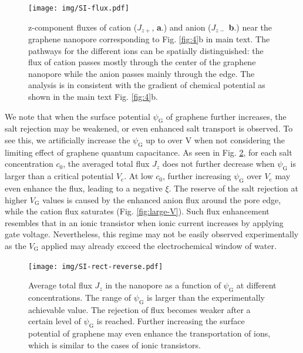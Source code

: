 \documentclass[journal=langd5,email=true, hyperref=true, keywords=false]{achemso}
\begin{document}
\begin{figure}[htbp]
  \centering
  \texttt{[image: img/SI-flux.pdf]}
  \caption{z-component fluxes of cation ($J_{z+}$, \textbf{a}.)  and
    anion ($J_{z-}$ \textbf{b}.) near the graphene nanopore
    corresponding to Fig. \ref{fig:4}b in main text. The
    pathways for the different ions can be spatially distinguished:
    the flux of cation passes mostly through the center of the
    graphene nanopore while the anion passes mainly through the
    edge. The analysis is in consistent with the gradient of chemical
    potential as shown in the main text Fig. \ref{fig:4}b.}
  \label{fig:flux}
\end{figure}

We note that when the surface potential $\psi_{\mathrm{G}}$ of
graphene further increases, the salt rejection may be weakened, or
even enhanced salt transport is observed. To see this, we artificially
increase the $\psi_{\mathrm{G}}$ up to over \unit[1]{V} when not considering
the limiting effect of graphene quantum capacitance. As seen in Fig.
\ref{fig:reverse}, for each salt concentration $c_{0}$, the averaged
total flux $J_{z}$ does not further decrease when $\psi_{\mathrm{G}}$
is larger than a critical potential $V_{\mathrm{c}}$. At low $c_{0}$,
further increasing $\psi_{\mathrm{G}}$ over $V_{\mathrm{c}}$ may even
enhance the flux, leading to a negative $\xi$. The reserve of the salt
rejection at higher $V_{\mathrm{G}}$ values is caused by the enhanced
anion flux around the pore edge, while the cation flux saturates
(Fig. \ref{fig:large-V}). Such flux enhancement resembles that in an
ionic transistor \cite{Nam_2009,Cheng_2018} when ionic current increases
by applying gate voltage. Nevertheless, this regime may not be easily observed experimentally as the $V_{\mathrm{G}}$ applied may already
exceed the electrochemical window of water.

\begin{figure}[htbp]
  \centering
  \texttt{[image: img/SI-rect-reverse.pdf]}
  \caption{Average total flux $J_{z}$ in the nanopore as
    a function of $\psi_{\mathrm{G}}$ at different concentrations. The
    range of $\psi_{\mathrm{G}}$ is larger than the experimentally
    achievable value. The rejection of flux becomes weaker after a
    certain level of $\psi_{\mathrm{G}}$ is reached. Further
    increasing the surface potential of graphene may even enhance the
    transportation of ions, which is similar to the cases of ionic
    transistors.}
  \label{fig:reverse}
\end{figure}
\end{document}
